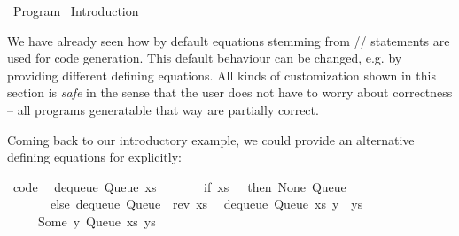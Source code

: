 %
\begin{isabellebody}%
\def\isabellecontext{Program}%
%
\isadelimtheory
%
\endisadelimtheory
%
\isatagtheory
{}\isamarkupfalse%
\ Program\isanewline
{}\ Introduction\isanewline
{}%
\endisatagtheory
{\isafoldtheory}%
%
\isadelimtheory
%
\endisadelimtheory
%
\isamarkuptrue%
%
\isamarkuptrue%
%
\begin{isamarkuptext}%
We have already seen how by default equations stemming from
  \hyperlink{command.definition}{\mbox{}}/\hyperlink{command.primrec}{\mbox{}}/\hyperlink{command.fun}{\mbox{}}
  statements are used for code generation.  This default behaviour
  can be changed, e.g. by providing different defining equations.
  All kinds of customization shown in this section is \emph{safe}
  in the sense that the user does not have to worry about
  correctness -- all programs generatable that way are partially
  correct.%
\end{isamarkuptext}%
\isamarkuptrue%
%
\isamarkuptrue%
%
\begin{isamarkuptext}%
Coming back to our introductory example, we
  could provide an alternative defining equations for 
  explicitly:%
\end{isamarkuptext}%
\isamarkuptrue%
%
\isadelimquoteme
%
\endisadelimquoteme
%
\isatagquoteme
{}\isamarkupfalse%
\ {\isacharbrackleft}code{\isacharbrackright}{\isacharcolon}\isanewline
\ \ {\isachardoublequoteopen}dequeue\ {\isacharparenleft}Queue\ xs\ {\isacharbrackleft}{\isacharbrackright}{\isacharparenright}\ {\isacharequal}\isanewline
\ \ \ \ \ {\isacharparenleft}if\ xs\ {\isacharequal}\ {\isacharbrackleft}{\isacharbrackright}\ then\ {\isacharparenleft}None{\isacharcomma}\ Queue\ {\isacharbrackleft}{\isacharbrackright}\ {\isacharbrackleft}{\isacharbrackright}{\isacharparenright}\isanewline
\ \ \ \ \ \ \ else\ dequeue\ {\isacharparenleft}Queue\ {\isacharbrackleft}{\isacharbrackright}\ {\isacharparenleft}rev\ xs{\isacharparenright}{\isacharparenright}{\isacharparenright}{\isachardoublequoteclose}\isanewline
\ \ {\isachardoublequoteopen}dequeue\ {\isacharparenleft}Queue\ xs\ {\isacharparenleft}y\ {\isacharhash}\ ys{\isacharparenright}{\isacharparenright}\ {\isacharequal}\isanewline
\ \ \ \ \ {\isacharparenleft}Some\ y{\isacharcomma}\ Queue\ xs\ ys{\isacharparenright}{\isachardoublequoteclose}\isanewline

\end{isabellebody}
